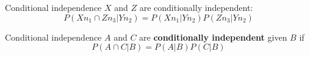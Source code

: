 \documentclass{beamer}
\newcommand{\crish}{\color{reddish}}
\newcommand{\cbla}{\color{black}}
\begin{document}
\begin{frame}{Conditional independence}
\crish$X$\cbla{} and \crish$Z$\cbla{} are conditionally independent:
\crish
$$
P(Xn_1\cap{}Zn_3|Yn_2)=P(Xn_1|Yn_2)P(Zn_3|Yn_2)
$$
\cbla
\end{frame}

\begin{frame}{Conditional independence}
  \crish$A$\cbla{} and  \crish$C$\cbla{} are \textbf{conditionally independent} given \crish$B$\cbla{} if
  \crish$$P(A\cap{}C|B)=P(A|B)P(C|B)$$\cbla{}
  \end{frame}
\end{document}
